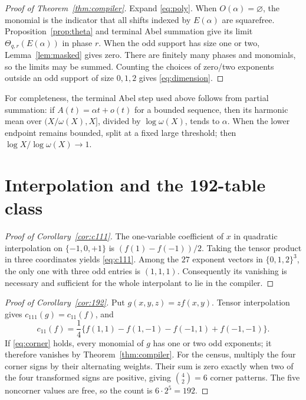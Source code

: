 \documentclass[11pt]{article}
\theoremstyle{definition}
\theoremstyle{remark}
\newcommand{\T}{\{-1,0,+1\}}
\begin{document}
\begin{proof}[Proof of Theorem~\ref{thm:compiler}]
Expand \eqref{eq:poly}.  When \(O(\alpha)=\varnothing\), the monomial is
the indicator that all shifts indexed by \(E(\alpha)\) are squarefree.
Proposition~\ref{prop:theta} and terminal Abel summation give its limit
\(\Theta_{q,r}(E(\alpha))\) in phase \(r\).  When the odd support has size
one or two, Lemma~\ref{lem:masked} gives zero.  There are finitely many
phases and monomials, so the limits may be summed.  Counting the choices of
zero/two exponents outside an odd support of size \(0,1,2\) gives
\eqref{eq:dimension}.
\end{proof}

For completeness, the terminal Abel step used above follows from partial
summation: if \(A(t)=\alpha t+o(t)\) for a bounded sequence, then its
harmonic mean over \((X/\omega(X),X]\), divided by \(\log\omega(X)\),
tends to \(\alpha\).  When the lower endpoint remains bounded, split at a
fixed large threshold; then \(\log X/\log\omega(X)\to1\).

\section{Interpolation and the 192-table class}

\begin{proof}[Proof of Corollary~\ref{cor:c111}]
The one-variable coefficient of \(x\) in quadratic interpolation on
\(\T\) is \((f(1)-f(-1))/2\).  Taking the tensor product in three
coordinates yields \eqref{eq:c111}.  Among the \(27\) exponent vectors in
\(\{0,1,2\}^3\), the only one with three odd entries is \((1,1,1)\).
Consequently its vanishing is necessary and sufficient for the whole
interpolant to lie in the compiler.
\end{proof}

\begin{proof}[Proof of Corollary~\ref{cor:192}]
Put \(g(x,y,z)=z f(x,y)\).  Tensor interpolation gives
\(c_{111}(g)=c_{11}(f)\), and
\[
 c_{11}(f)=\frac14\{f(1,1)-f(1,-1)-f(-1,1)+f(-1,-1)\}.
\]
If \eqref{eq:corner} holds, every monomial of \(g\) has one or two odd
exponents; it therefore vanishes by Theorem~\ref{thm:compiler}.  For the
census, multiply the four corner signs by their alternating weights.  Their
sum is zero exactly when two of the four transformed signs are positive,
giving \(\binom42=6\) corner patterns.  The five noncorner values are free,
so the count is \(6\cdot2^5=192\).
\end{proof}
\end{document}
